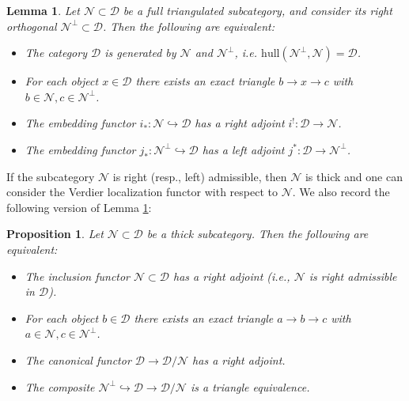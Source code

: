 \documentclass[sn-mathphys-num]{sn-jnl}%
\newcommand{\N}{\mathcal N}
\newcommand{\D}{\mathcal D}
\newcommand{\hull}{{\mathrm{hull}}}
\newtheorem{lemma}[theorem]{Lemma}
\newtheorem{proposition}[theorem]{Proposition}
\theoremstyle{definition}
\begin{document}
\begin{lemma}\cite[Lemma 3.1]{Bondal}\label{lem:notorious}
Let $\N\subset \D$ be a full triangulated subcategory, and consider its right orthogonal $\N ^{\perp}\subset \D$. Then the following are equivalent:

\begin{itemize}

\item[(1)] The category $\D$ is generated by $\N$ and $\N ^{\perp}$, i.e.
$\hull(\N ^{\perp},\N)=\D$.

\item[(2)] For each object $x\in \D$ there exists an exact triangle $b\rightarrow x\rightarrow c$ with $b\in \N,c\in \N ^{\perp}$.

\item[(3)] The embedding functor $i_{\ast}:\N\hookrightarrow \D$ has a right adjoint $i^!:\D\rightarrow \N$.

\item[(4)] The embedding functor $j_{\ast}:\N ^{\perp}\hookrightarrow \D$ has a left adjoint $j^{\ast}:\D\rightarrow \N ^{\perp}$.

\end{itemize}

\end{lemma}

If the subcategory $\N$ is right (resp., left) admissible, then $\N$ is thick and one can consider the Verdier localization functor with respect to $\N$. We also record the following version of Lemma \ref{lem:notorious}:


\begin{proposition}\cite[Proposition 3.2.8]{Kr}
Let $\N\subset \D$ be a thick subcategory. Then the following are equivalent:

\begin{itemize}

\item[(1)] The inclusion functor $\N\subset \D$ has a right adjoint (i.e., $\N$ is right admissible in $\D$).

\item[(2)] For each object $b\in \D$ there exists an exact triangle $a\rightarrow b\rightarrow c$ with $a\in \N,c\in \N ^{\perp}$.

\item[(3)] The canonical functor $\D \rightarrow \D /\N$ has a right adjoint.

\item[(4)] The composite $\N ^{\perp}\hookrightarrow \D \rightarrow \D/\N$ is a triangle equivalence.

\end{itemize}

\end{proposition}
\end{document}
